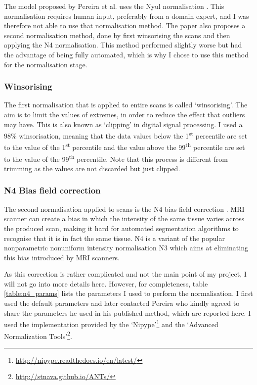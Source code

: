 \documentclass[12pt,a4paper,twoside,openright]{report}
\begin{document}
The model proposed by Pereira et al. \cite{pereira} uses the Nyul normalisation \cite{nyul}. This normalisation requires human input, preferably from a domain expert, and I was therefore not able to use that normalisation method. The paper also proposes a second normalisation method, done by first winsorising the scans and then applying the N4 normalisation. This method performed slightly worse but had the advantage of being fully automated, which is why I chose to use this method for the normalisation stage.

\subsubsection{Winsorising}
The first normalisation that is applied to entire scans is called `winsorising'. The aim is to limit the values of extremes, in order to reduce the effect that outliers may have. This is also known as `clipping' in digital signal processing. I used a 98\% winsorisation, meaning that the data values below the 1\textsuperscript{st} percentile are set to the value of the 1\textsuperscript{st} percentile and the value above the 99\textsuperscript{th} percentile are set to the value of the 99\textsuperscript{th} percentile. Note that this process is different from trimming as the values are not discarded but just clipped.

\subsubsection{N4 Bias field correction}
The second normalisation applied to scans is the N4 bias field correction \cite{n4itk}. MRI scanner can create a bias in which the intensity of the same tissue varies across the produced scan, making it hard for automated segmentation algorithms to recognise that it is in fact the same tissue. N4 is a variant of the popular nonparametric nonuniform intensity normalisation N3 which aims at eliminating this bias introduced by MRI scanners. 

As this correction is rather complicated and not the main point of my project, I will not go into more details here. However, for completeness, table \ref{table:n4_params} lists the parameters I used to perform the normalisation. I first used the default parameters and later contacted Pereira who kindly agreed to share the parameters he used in his published method, which are reported here. I used the implementation provided by the `Nipype'\footnote{\url{http://nipype.readthedocs.io/en/latest/}} and the `Advanced Normalization Tools'\footnote{\url{http://stnava.github.io/ANTs/}}.
\end{document}
